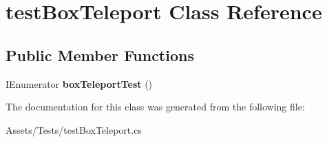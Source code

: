 \hypertarget{classtest_box_teleport}{}\section{test\+Box\+Teleport Class Reference}
\label{classtest_box_teleport}
\subsection*{Public Member Functions}
\begin{DoxyCompactItemize}
\item 
\mbox{\label{classtest_box_teleport_adbf4c6470d0f2683959d5376beec0990}} 
I\+Enumerator {\bfseries box\+Teleport\+Test} ()
\end{DoxyCompactItemize}


The documentation for this class was generated from the following file\+:\begin{DoxyCompactItemize}
\item 
Assets/\+Tests/test\+Box\+Teleport.\+cs\end{DoxyCompactItemize}
